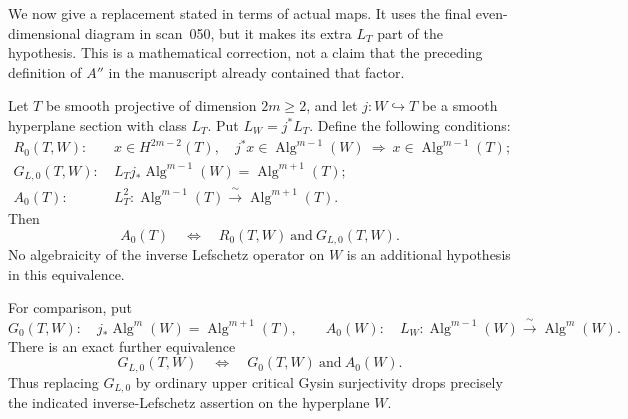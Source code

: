 We now give a replacement stated in terms of actual maps.  It uses
the final even-dimensional diagram in scan~050, but it makes its
extra $L_T$ part of the hypothesis.  This is a mathematical correction,
not a claim that the preceding definition of $A''$ in the manuscript
already contained that factor.

\begin{theorem}
\label{thm:weighted-critical}
Let $T$ be smooth projective of dimension $2m\ge2$, and let
$j:W\hookrightarrow T$ be a smooth hyperplane section with class $L_T$.
Put $L_W=j^*L_T$.  Define the following conditions:
\begin{align*}
 R_0(T,W):\ &x\in H^{2m-2}(T),\quad
             j^*x\in\operatorname{Alg}^{m-1}(W)
             \ \Longrightarrow\ x\in\operatorname{Alg}^{m-1}(T);\\
 G_{L,0}(T,W):\ &L_Tj_*\operatorname{Alg}^{m-1}(W)
                    =\operatorname{Alg}^{m+1}(T);\\
 A_0(T):\ &L_T^2:\operatorname{Alg}^{m-1}(T)
                    \xrightarrow{\ \sim\ }
                    \operatorname{Alg}^{m+1}(T).
\end{align*}
Then
\begin{equation}
 A_0(T)\quad\Longleftrightarrow\quad
 R_0(T,W)\ \text{and}\ G_{L,0}(T,W).
 \label{eq:weighted-equivalence}
\end{equation}
No algebraicity of the inverse Lefschetz operator on $W$ is an
additional hypothesis in this equivalence.

For comparison, put
\[
 G_0(T,W):\quad
 j_*\operatorname{Alg}^{m}(W)=\operatorname{Alg}^{m+1}(T),
 \qquad
 A_0(W):\quad L_W:\operatorname{Alg}^{m-1}(W)
                       \xrightarrow{\ \sim\ }\operatorname{Alg}^{m}(W).
\]
There is an exact further equivalence
\begin{equation}
 G_{L,0}(T,W)\quad\Longleftrightarrow\quad
 G_0(T,W)\ \text{and}\ A_0(W).
 \label{eq:gysin-hidden-inverse}
\end{equation}
Thus replacing $G_{L,0}$ by ordinary upper critical Gysin
surjectivity drops precisely the indicated inverse-Lefschetz
assertion on the hyperplane $W$.
\end{theorem}
